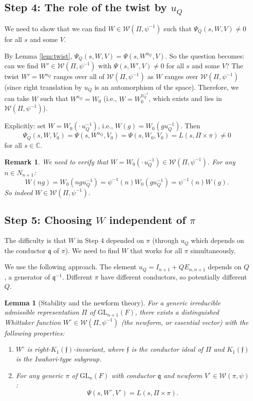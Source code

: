 \documentclass[12pt]{article}
\newtheorem{lemma}[theorem]{Lemma}
\newtheorem{remark}[theorem]{Remark}
\begin{document}
\subsection{Step 4: The role of the twist by $u_Q$}

We need to show that we can find $W \in \mathcal{W}(\Pi, \psi^{-1})$ such that $\Psi_Q(s, W, V) \neq 0$ for all $s$ and some $V$.

By Lemma \ref{lem:twist}, $\Psi_Q(s, W, V) = \Psi(s, W^{u_Q}, V)$. So the question becomes: can we find $W' \in \mathcal{W}(\Pi, \psi^{-1})$ with $\Psi(s, W', V) \neq 0$ for all $s$ and some $V$? The twist $W' = W^{u_Q}$ ranges over all of $\mathcal{W}(\Pi, \psi^{-1})$ as $W$ ranges over $\mathcal{W}(\Pi, \psi^{-1})$ (since right translation by $u_Q$ is an automorphism of the space). Therefore, we can take $W$ such that $W^{u_Q} = W_0$ (i.e., $W = W_0^{u_Q^{-1}}$, which exists and lies in $\mathcal{W}(\Pi, \psi^{-1})$).

Explicitly: set $W = W_0(\cdot \, u_Q^{-1})$, i.e., $W(g) = W_0(g u_Q^{-1})$. Then
\[
\Psi_Q(s, W, V_0) = \Psi(s, W^{u_Q}, V_0) = \Psi(s, W_0, V_0) = L(s, \Pi \times \pi) \neq 0
\]
for all $s \in \mathbb{C}$.

\begin{remark}
We need to verify that $W = W_0(\cdot \, u_Q^{-1}) \in \mathcal{W}(\Pi, \psi^{-1})$. For any $n \in N_{n+1}$:
\[
W(ng) = W_0(ng u_Q^{-1}) = \psi^{-1}(n) W_0(g u_Q^{-1}) = \psi^{-1}(n) W(g).
\]
So indeed $W \in \mathcal{W}(\Pi, \psi^{-1})$.
\end{remark}

\subsection{Step 5: Choosing $W$ independent of $\pi$}

The difficulty is that $W$ in Step 4 depended on $\pi$ (through $u_Q$ which depends on the conductor $\mathfrak{q}$ of $\pi$). We need to find $W$ that works for all $\pi$ simultaneously.

We use the following approach. The element $u_Q = I_{n+1} + Q E_{n,n+1}$ depends on $Q$, a generator of $\mathfrak{q}^{-1}$. Different $\pi$ have different conductors, so potentially different $Q$.

\begin{lemma}[Stability and the newform theory]\label{lem:newform}
For a generic irreducible admissible representation $\Pi$ of $\mathrm{GL}_{n+1}(F)$, there exists a distinguished Whittaker function $W^\circ \in \mathcal{W}(\Pi, \psi^{-1})$ (the newform, or essential vector) with the following properties:
\begin{enumerate}
\item[(i)] $W^\circ$ is right-$K_1(\mathfrak{f})$-invariant, where $\mathfrak{f}$ is the conductor ideal of $\Pi$ and $K_1(\mathfrak{f})$ is the Iwahori-type subgroup.
\item[(ii)] For any generic $\pi$ of $\mathrm{GL}_n(F)$ with conductor $\mathfrak{q}$ and newform $V^\circ \in \mathcal{W}(\pi, \psi)$:
\[
\Psi(s, W^\circ, V^\circ) = L(s, \Pi \times \pi).
\]
\end{enumerate}
\end{lemma}
\end{document}
